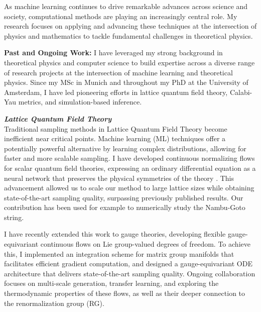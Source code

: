 \documentclass[11pt]{article}
\title{}
\author{}
\date{}
\begin{document}
\thispagestyle{firstpagestyle}

As machine learning continues to drive remarkable advances across science and society, computational methods are playing an increasingly central role.
My research focuses on applying and advancing these techniques at the intersection of physics and mathematics to tackle fundamental challenges in theoretical physics.

\textbf{{Past and Ongoing Work:}}
I have leveraged my strong background in theoretical physics and computer science to build expertise across a diverse range of research projects at the intersection of machine learning and theoretical physics.
Since my MSc in Munich and throughout my PhD at the University of Amsterdam, I have led pioneering efforts in {lattice quantum field theory}, {Calabi-Yau metrics}, and {simulation-based inference}.

\textbf{\textit{{Lattice Quantum Field Theory}}}\\
Traditional sampling methods in Lattice Quantum Field Theory become inefficient near critical points. Machine learning (ML) techniques offer a potentially powerful alternative by learning complex distributions, allowing for faster and more scalable sampling.
I have developed {continuous normalizing flows} for scalar quantum field theories, expressing an ordinary differential equation as a neural network that preserves the physical symmetries of the theory \cite{gerdes2023LearningLattice}.
This advancement allowed us to scale our method to large lattice sizes while obtaining state-of-the-art sampling quality, surpassing previously published results. Our contribution has been used for example to numerically study the Nambu-Goto string.

I have recently extended this work to gauge theories, developing flexible gauge-equivariant continuous flows on Lie group-valued degrees of freedom. To achieve this, I implemented an integration scheme for matrix group manifolds that facilitates efficient gradient computation, and designed a gauge-equivariant ODE architecture that delivers state-of-the-art sampling quality. Ongoing collaboration focuses on multi-scale generation, transfer learning, and exploring the thermodynamic properties of these flows, as well as their deeper connection to the renormalization group (RG).
\end{document}

